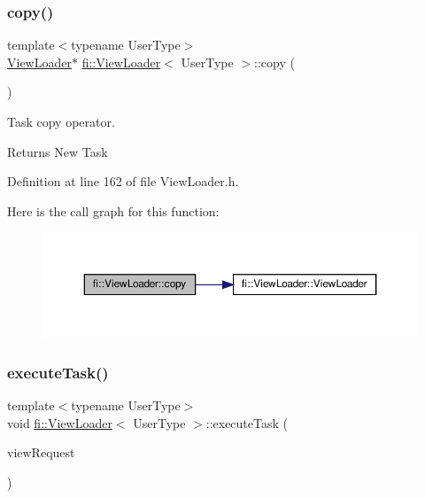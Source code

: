 \subsubsection{\texorpdfstring{copy()}{copy()}}
{\footnotesize\ttfamily template$<$typename User\+Type$>$ \\
\hyperlink{classfi_1_1ViewLoader}{View\+Loader}$\ast$ \hyperlink{classfi_1_1ViewLoader}{fi\+::\+View\+Loader}$<$ User\+Type $>$\+::copy (\begin{DoxyParamCaption}{ }\end{DoxyParamCaption})\hspace{0.3cm}{\ttfamily [inline]}}



Task copy operator. 

\begin{DoxyReturn}{Returns}
New Task 
\end{DoxyReturn}


Definition at line 162 of file View\+Loader.\+h.

Here is the call graph for this function\+:
\nopagebreak
\begin{figure}[H]
\begin{center}
\leavevmode
\includegraphics[width=350pt]{d8/daf/classfi_1_1ViewLoader_aa7d11a576a793de8b4c870c40534b75d_cgraph}
\end{center}
\end{figure}
\mbox{\label{classfi_1_1ViewLoader_a15c6540ddf5a8636511be49bb4d2844b}} 
\subsubsection{\texorpdfstring{execute\+Task()}{executeTask()}}
{\footnotesize\ttfamily template$<$typename User\+Type$>$ \\
void \hyperlink{classfi_1_1ViewLoader}{fi\+::\+View\+Loader}$<$ User\+Type $>$\+::execute\+Task (\begin{DoxyParamCaption}\item[{std\+::shared\+\_\+ptr$<$ \hyperlink{classfi_1_1HTGSViewRequestData}{fi\+::\+H\+T\+G\+S\+View\+Request\+Data}$<$ User\+Type $>$$>$}]{view\+Request }\end{DoxyParamCaption})\hspace{0.3cm}{\ttfamily [inline]}}



